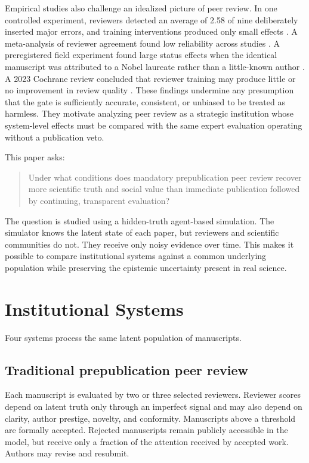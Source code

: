 \documentclass[11pt]{article}
\begin{document}
Empirical studies also challenge an idealized picture of peer review. In one controlled experiment, reviewers detected an average of 2.58 of nine deliberately inserted major errors, and training interventions produced only small effects \citep{schroter2008}. A meta-analysis of reviewer agreement found low reliability across studies \citep{bornmann2010}. A preregistered field experiment found large status effects when the identical manuscript was attributed to a Nobel laureate rather than a little-known author \citep{huber2022}. A 2023 Cochrane review concluded that reviewer training may produce little or no improvement in review quality \citep{hesselberg2023}. These findings undermine any presumption that the gate is sufficiently accurate, consistent, or unbiased to be treated as harmless. They motivate analyzing peer review as a strategic institution whose system-level effects must be compared with the same expert evaluation operating without a publication veto.

This paper asks:

\begin{quote}
Under what conditions does mandatory prepublication peer review recover more scientific truth and social value than immediate publication followed by continuing, transparent evaluation?
\end{quote}

The question is studied using a hidden-truth agent-based simulation. The simulator knows the latent state of each paper, but reviewers and scientific communities do not. They receive only noisy evidence over time. This makes it possible to compare institutional systems against a common underlying population while preserving the epistemic uncertainty present in real science.

\section{Institutional Systems}

Four systems process the same latent population of manuscripts.

\subsection{Traditional prepublication peer review}

Each manuscript is evaluated by two or three selected reviewers. Reviewer scores depend on latent truth only through an imperfect signal and may also depend on clarity, author prestige, novelty, and conformity. Manuscripts above a threshold are formally accepted. Rejected manuscripts remain publicly accessible in the model, but receive only a fraction of the attention received by accepted work. Authors may revise and resubmit.
\end{document}
